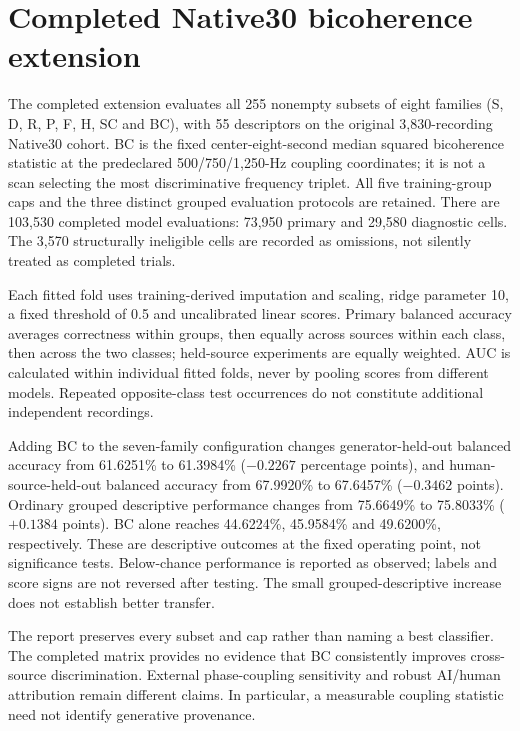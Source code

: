 \section{Completed Native30 bicoherence extension}
\label{sec:native30-bc-completed}
The completed extension evaluates all 255 nonempty subsets of eight families
(S, D, R, P, F, H, SC and BC), with 55 descriptors on the original 3,830-recording
Native30 cohort. BC is the fixed center-eight-second median squared
bicoherence statistic at the predeclared 500/750/1,250-Hz coupling coordinates;
it is not a scan selecting the most discriminative frequency triplet.
All five training-group caps and the three distinct grouped evaluation
protocols are retained. There are 103,530 completed model evaluations:
73,950 primary and 29,580 diagnostic cells. The 3,570 structurally ineligible
cells are recorded as omissions, not silently treated as completed trials.

Each fitted fold uses training-derived imputation and scaling, ridge parameter
10, a fixed threshold of 0.5 and uncalibrated linear scores. Primary balanced
accuracy averages correctness within groups, then equally across sources within
each class, then across the two classes; held-source experiments are equally
weighted. AUC is calculated within individual fitted folds, never by pooling
scores from different models. Repeated opposite-class test occurrences do not
constitute additional independent recordings.



Adding BC to the seven-family configuration changes generator-held-out balanced
accuracy from 61.6251\% to 61.3984\% ($-0.2267$ percentage points), and
human-source-held-out balanced accuracy from 67.9920\% to 67.6457\%
($-0.3462$ points). Ordinary grouped descriptive performance changes from
75.6649\% to 75.8033\% ($+0.1384$ points). BC alone reaches 44.6224\%,
45.9584\% and 49.6200\%, respectively. These are descriptive outcomes at the
fixed operating point, not significance tests. Below-chance performance is
reported as observed; labels and score signs are not reversed after testing.
The small grouped-descriptive increase does not establish better transfer.

The report preserves every subset and cap rather than naming a best classifier.
The completed matrix provides no evidence that BC consistently improves
cross-source discrimination. External phase-coupling sensitivity and robust
AI/human attribution remain different claims. In particular, a measurable
coupling statistic need not identify generative provenance.

